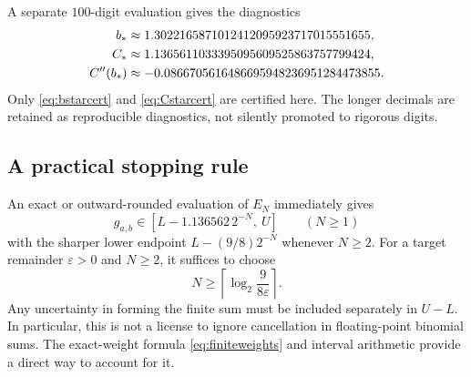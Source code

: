 A separate $100$-digit evaluation gives the diagnostics
\begin{align*}
 b_*&\approx1.3022165871012412095923717015551655,\\
 C_*&\approx1.1365611033395095609525863757799424,\\
 C''(b_*)&\approx-0.0866705616486695948236951284473855.
\end{align*}
Only \eqref{eq:bstarcert} and \eqref{eq:Cstarcert} are certified here. The longer decimals are retained as reproducible diagnostics, not silently promoted to rigorous digits.

\subsection{A practical stopping rule}
An exact or outward-rounded evaluation of $E_N$ immediately gives
\[
 g_{a,b}\in[L-1.136562\,2^{-N},\ U]\qquad(N\ge1)
\]
with the sharper lower endpoint $L-(9/8)2^{-N}$ whenever $N\ge2$. For a target remainder $\varepsilon>0$ and $N\ge2$, it suffices to choose
\[
 N\ge\left\lceil\log_2\frac{9}{8\varepsilon}\right\rceil.
\]
Any uncertainty in forming the finite sum must be included separately in $U-L$. In particular, this is not a license to ignore cancellation in floating-point binomial sums. The exact-weight formula \eqref{eq:finiteweights} and interval arithmetic provide a direct way to account for it.
